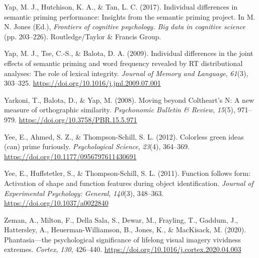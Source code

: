 \documentclass[
  12pt,
  man,floatsintext]{apa7}
\newlength{\cslhangindent}
\newlength{\cslentryspacingunit} %
\newenvironment{CSLReferences}[2] %
 {%
  \setlength{\parindent}{0pt}
  \ifodd #1
  \let\oldpar\par
  \def\par{\hangindent=\cslhangindent\oldpar}
  \fi
  \setlength{\parskip}{#2\cslentryspacingunit}
 }%
 {}
\renewcommand\appendix{}
\begin{document}
\begin{CSLReferences}{1}{0}
\leavevmode{}%
Yap, M. J., Hutchison, K. A., \& Tan, L. C. (2017). Individual differences in semantic priming performance: {Insights} from the semantic priming project. In M. N. Jones (Ed.), \emph{Frontiers of cognitive psychology. {Big} data in cognitive science} (pp. 203--226). {Routledge/Taylor \& Francis Group}.

\leavevmode{}%
Yap, M. J., Tse, C.-S., \& Balota, D. A. (2009). Individual differences in the joint effects of semantic priming and word frequency revealed by {RT} distributional analyses: {The} role of lexical integrity. \emph{Journal of Memory and Language}, \emph{61}(3), 303--325. \url{https://doi.org/10.1016/j.jml.2009.07.001}

\leavevmode{}%
Yarkoni, T., Balota, D., \& Yap, M. (2008). Moving beyond {Coltheart}'s {N}: {A} new measure of orthographic similarity. \emph{Psychonomic Bulletin \& Review}, \emph{15}(5), 971--979. \url{https://doi.org/10.3758/PBR.15.5.971}

\leavevmode{}%
Yee, E., Ahmed, S. Z., \& Thompson-Schill, S. L. (2012). Colorless green ideas (can) prime furiously. \emph{Psychological Science}, \emph{23}(4), 364--369. \url{https://doi.org/10.1177/0956797611430691}

\leavevmode{}%
Yee, E., Huffstetler, S., \& Thompson-Schill, S. L. (2011). Function follows form: {Activation} of shape and function features during object identification. \emph{Journal of Experimental Psychology: General}, \emph{140}(3), 348--363. \url{https://doi.org/10.1037/a0022840}

\leavevmode{}%
Zeman, A., Milton, F., Della Sala, S., Dewar, M., Frayling, T., Gaddum, J., Hattersley, A., Heuerman-Williamson, B., Jones, K., \& MacKisack, M. (2020). Phantasia---the psychological significance of lifelong visual imagery vividness extremes. \emph{Cortex}, \emph{130}, 426--440. \url{https://doi.org/10.1016/j.cortex.2020.04.003}

\end{CSLReferences}

\newpage

\hypertarget{appendix-appendix}{%
\appendix}


\renewcommand{\thefigure}{A\arabic{figure}} \setcounter{figure}{0}
\renewcommand{\thetable}{A\arabic{table}} \setcounter{table}{0}
\end{document}
